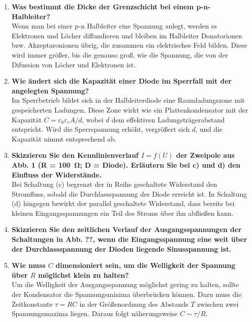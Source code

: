 \documentclass{article}
\begin{document}
\begin{enumerate}[label=\textbf{(\Alph*)}]
    \item \textbf{Was bestimmt die Dicke der Grenzschicht bei einem p-n-Halbleiter?}
    \\ Wenn man bei einer p-n Halbleiter eine Spannung anlegt, werden es Elektronen und Löcher diffundieren 
    und bleiben im Halbleiter Donatorionen bzw. Akzeptaronionen übrig, die 
    zusammen ein elektrisches Feld bilden. Diese wird immer größer, bis die genauso groß, wie die 
    Spannung, die von der Difussion von Löcher und Elektronen ist. 
    \item \textbf{Wie ändert sich die Kapazität einer Diode im Sperrfall mit der angelegten Spannung?}
    \\ Im Sperrbetrieb bildet sich in der Halbleiterdiode eine Raumladungszone mit gespeicherten
     Ladungen. Diese Zone wirkt wie ein Plattenkondensator mit der Kapazität
      \( C = \varepsilon_0 \varepsilon_r A / d \), wobei \( d \) dem effektiven Ladungsträgerabstand entspricht. Wird die Sperrspannung erhöht, vergrößert sich \( d \), und die Kapazität nimmt entsprechend ab.
 
    \item \textbf{Skizzieren Sie den Kennlinienverlauf $I = f(U)$ der Zweipole aus Abb. 1 (R = \SI{100}{\ohm}; D = Diode). Erläutern Sie bei c) und d) den Einfluss der Widerstände.}
    \\ Bei Schaltung (c) begrenzt der in Reihe geschaltete Widerstand den Stromfluss, sobald die Durchlassspannung der Diode erreicht ist. In Schaltung (d) hingegen bewirkt der parallel geschaltete Widerstand, dass bereits bei kleinen Eingangsspannungen ein Teil des Stroms über ihn abfließen kann.
 
    \item \textbf{Skizzieren Sie den zeitlichen Verlauf der Ausgangsspannungen der Schaltungen in Abb. ??, wenn die Eingangsspannung eine weit über der Durchlassspannung der Dioden liegende Sinusspannung ist.}
    \\ 
    \item \textbf{Wie muss $C$ dimensioniert sein, um die Welligkeit der Spannung über $R$ möglichst klein zu halten?}
    \\ Um die Welligkeit der Ausgangsspannung möglichst gering zu halten, sollte der Kondensator die Spannungsminima überbrücken können. Dazu muss die Zeitkonstante \( \tau = RC \) in der Größenordnung des Abstands \( T \) zwischen zwei Spannungsmaxima liegen. Daraus folgt näherungsweise \( C \sim \tau / R \).


\end{enumerate}
\end{document}

